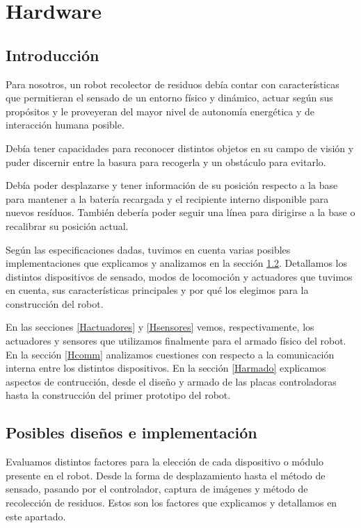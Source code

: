 \section{Hardware}

\subsection{Introducci\'on}
\label{Hintro}
Para nosotros, un robot recolector de residuos deb\'ia contar con caracter\'isticas que permitieran el sensado de un entorno f\'isico y din\'amico,
actuar seg\'un sus prop\'ositos y le proveyeran del mayor nivel de autonom\'ia energ\'etica y de interacci\'on humana posible.

Deb\'ia tener capacidades para reconocer distintos objetos en su campo de visi\'on y puder discernir entre la basura para recogerla y un
obst\'aculo para evitarlo.

Deb\'ia poder desplazarse y tener informaci\'on de su posici\'on respecto a la base para mantener a la bater\'ia recargada y
el recipiente interno disponible para nuevos res\'iduos. Tambi\'en deber\'ia poder seguir una l\'inea para dirigirse a la base o recalibrar
su posici\'on actual.

Seg\'un las especificaciones dadas, tuvimos en cuenta varias posibles implementaciones que explicamos y analizamos en la secci\'on \ref{HposiblesDisenos}.
Detallamos los distintos dispositivos de sensado, modos de locomoci\'on y actuadores que tuvimos en cuenta, sus caracter\'isticas principales y por qu\'e
los elegimos para la construcci\'on del robot.

En las secciones \ref{Hactuadores} y \ref{Hsensores} vemos, respectivamente, los actuadores y sensores que utilizamos finalmente para el armado
f\'isico del robot.
En la secci\'on \ref{Hcomm} analizamos cuestiones con respecto a la comunicaci\'on interna entre los distintos dispositivos.
En la secci\'on \ref{Harmado} explicamos aspectos de contrucci\'on, desde el dise\~no y armado de las placas controladoras hasta la
construcci\'on del primer prototipo del robot.

\subsection{Posibles dise\~nos e implementaci\'on}
\label{HposiblesDisenos}

Evaluamos distintos factores para la elecci\'on de cada dispositivo o m\'odulo presente en el robot. Desde la forma de desplazamiento hasta  el
m\'etodo de sensado, pasando por el controlador, captura de im\'agenes y m\'etodo de recolecci\'on de residuos. Estos son los factores que explicamos y
detallamos en este apartado.

